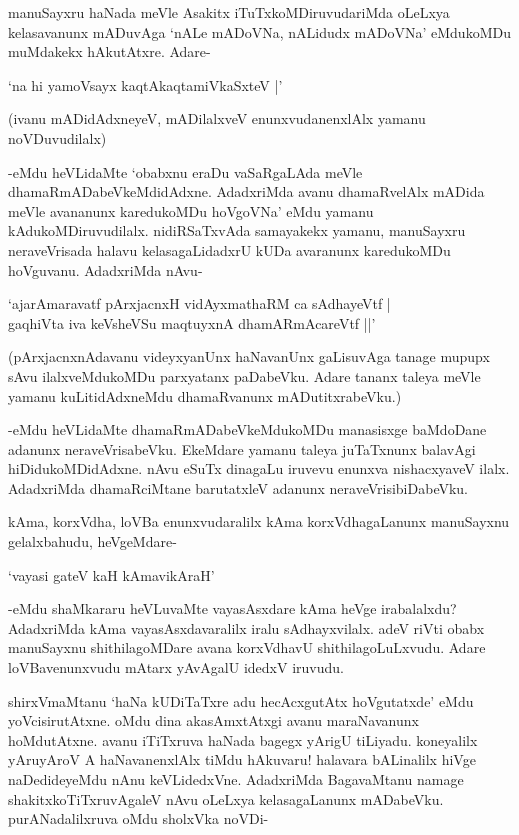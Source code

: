 manuSayxru haNada meVle Asakitx iTuTxkoMDiruvudariMda oLeLxya kelasavanunx mADuvAga `nALe mADoVNa, nALidudx mADoVNa' eMdukoMDu muMdakekx hAkutAtxre. Adare-

\begin{shloka}
`na hi yamoV\s sayx kaqtAkaqtamiVkaSxteV |'
\end{shloka}

(ivanu mADidAdxneyeV, mADilalxveV enunxvudanenxlAlx yamanu noVDuvudilalx)

-eMdu heVLidaMte `obabxnu eraDu vaSaRgaLAda meVle dhamaRmADabeVkeMdidAdxne. AdadxriMda avanu dhamaRvelAlx mADida meVle avananunx karedukoMDu hoVgoVNa' eMdu yamanu kAdukoMDiruvudilalx. nidiRSaTxvAda samayakekx yamanu, manuSayxru neraveVrisada halavu kelasagaLidadxrU kUDa avaranunx karedukoMDu hoVguvanu. AdadxriMda nAvu-

\begin{shloka}
`ajarAmaravatf pArxjacnxH vidAyxmathaRM ca sAdhayeVtf |\\
gaqhiVta iva keVsheVSu maqtuyxnA dhamARmAcareVtf ||'
\end{shloka}

(pArxjacnxnAdavanu videyxyanUnx haNavanUnx gaLisuvAga tanage mupupx sAvu ilalxveMdukoMDu parxyatanx paDabeVku. Adare tananx taleya meVle yamanu kuLitidAdxneMdu dhamaRvanunx mADutitxrabeVku.)

-eMdu heVLidaMte dhamaRmADabeVkeMdukoMDu manasisxge baMdoDane adanunx neraveVrisabeVku. EkeMdare yamanu taleya juTaTxnunx balavAgi hiDidukoMDidAdxne. nAvu eSuTx dinagaLu iruvevu enunxva nishacxyaveV ilalx. AdadxriMda dhamaRciMtane barutatxleV adanunx neraveVrisibiDabeVku.

kAma, korxVdha, loVBa enunxvudaralilx kAma korxVdhagaLanunx manuSayxnu gelalxbahudu, heVgeMdare-

\begin{shloka}
`vayasi gateV kaH kAmavikAraH'
\end{shloka}

-eMdu shaMkararu heVLuvaMte vayasAsxdare kAma heVge irabalalxdu? AdadxriMda kAma vayasAsxdavaralilx iralu sAdhayxvilalx. adeV riVti obabx manuSayxnu shithilagoMDare avana korxVdhavU shithilagoLuLxvudu. Adare loVBavenunxvudu mAtarx yAvAgalU idedxV iruvudu.

shirxVmaMtanu `haNa kUDiTaTxre adu hecAcxgutAtx hoVgutatxde' eMdu yoVcisirutAtxne. oMdu dina akasAmxtAtxgi avanu maraNavanunx hoMdutAtxne. avanu iTiTxruva haNada bagegx yArigU tiLiyadu. koneyalilx yAruyAroV A haNavanenxlAlx tiMdu hAkuvaru! halavara bALinalilx hiVge naDedideyeMdu nAnu keVLidedxVne. AdadxriMda BagavaMtanu namage shakitxkoTiTxruvAgaleV nAvu oLeLxya kelasagaLanunx mADabeVku. purANadalilxruva oMdu sholxVka noVDi-

